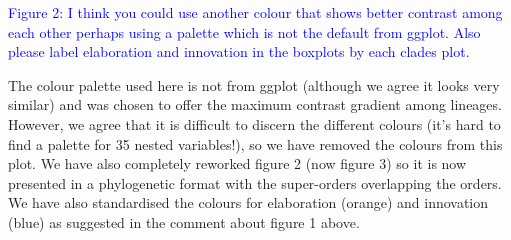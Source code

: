 \documentclass[12pt,letterpaper]{article}
\begin{document}
{\textcolor{blue}{Figure 2: I think you could use another colour that shows better contrast among each other perhaps using a palette which is not the default from ggplot. Also please label elaboration and innovation in the boxplots by each clades plot.}

The colour palette used here is not from ggplot (although we agree it looks very similar) and was chosen to offer the maximum contrast gradient among lineages. However, we agree that it is difficult to discern the different colours (it’s hard to find a palette for 35 nested variables!), so we have removed the colours from this plot. We have also completely reworked figure 2 (now figure 3) so it is now presented in a phylogenetic format with the super-orders overlapping the orders. We have also standardised the colours for elaboration (orange) and innovation (blue) as suggested in the comment about figure 1 above.

\newpage

}
\end{document}
